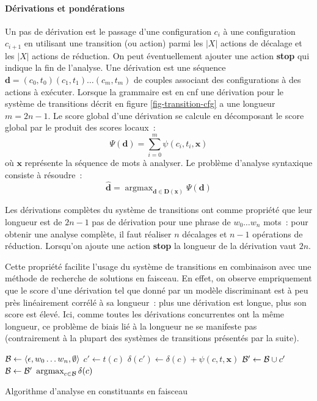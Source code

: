 \documentclass[11pt,openany]{book}
\begin{document}
\paragraph{Dérivations et pondérations}
Un pas de dérivation est le passage d’une configuration $c_i$ à  une configuration $c_{i+1}$ 
en utilisant une transition (ou action) parmi les $|X|$ actions de décalage  et les $|X|$ actions de réduction.
On peut éventuellement ajouter une action {\bf stop}  qui indique la fin de l'analyse.
Une dérivation est une séquence $\mathbf{d} = (c_0,t_0) (c_1,t_1) \ldots (c_m,t_m)$
de couples associant des configurations à des actions à exécuter. Lorsque la grammaire est en {\sc cnf}
une dérivation pour le système de transitions décrit en figure \ref{fig-transition-cfg} a une longueur $m = 2n-1$.
Le score global d'une dérivation se calcule en décomposant le score global par le produit des scores locaux~:
\begin{equation}
\Psi(\mathbf{d}) = \sum_{i=0}^m \psi (c_i,t_i,\mathbf{x})
\end{equation}
où $\mathbf{x}$ représente la séquence de mots à analyser. Le problème d'analyse syntaxique consiste à résoudre~:
\begin{equation}
\hat{\mathbf{d}} = \mathop{\text{argmax}}_{\mathbf{d} \in \mathbf{D}(\mathbf{x})} \Psi(\mathbf{d})
\end{equation}

Les dérivations complètes du système de transitions ont comme
propriété que leur longueur est de $2n-1$ pas de dérivation pour une
phrase de $w_0\ldots w_n$ mots~:  pour obtenir une analyse complète,
il faut réaliser $n$ décalages et $n-1$ opérations de réduction.
Lorsqu'on ajoute une action {\bf stop} la longueur de la dérivation
vaut $2n$.

Cette propriété facilite l'usage du système de transitions en
combinaison avec une méthode de recherche de solutions en faisceau.
En effet, on observe empriquement que le score d'une dérivation tel
que donné par un modèle discriminant est à peu près linéairement
corrélé à sa longueur~: plus une dérivation est longue, plus son score
est élevé. Ici, comme toutes les dérivations concurrentes ont la même
longueur, ce problème de biais lié à la longueur ne se manifeste pas
(contrairement à la plupart des systèmes de transitions présentés par la suite).


\begin{algorithm}[htbp]
\begin{algorithmic}[0]
\State ${\cal B} \gets \langle \epsilon, w_0\ldots w_n,\emptyset\rangle$
\State $c' \gets t(c)$
\State $\delta(c') \gets \delta(c) + \psi(c,t,\mathbf{x})$
\State ${\cal B}' \gets {\cal B}\cup c'$
\EndFor
\EndFor
\State ${\cal B} \gets {\cal B}'$
\EndFor
\State \Return $\mathop{\text{argmax}}_{c\in \cal B} \delta(c)$
\EndFunction
\end{algorithmic}
\caption{\label{algo-cfg-beam}Algorithme d'analyse en constituants en
faisceau}
\end{algorithm}
\end{document}
